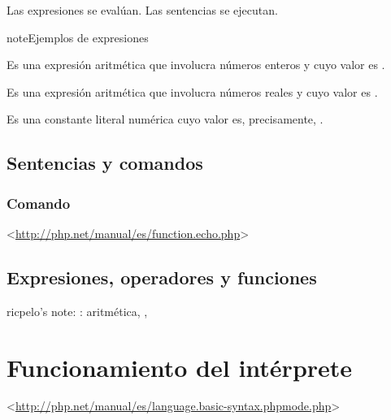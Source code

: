 \documentclass[a4paper,11pt,spanish]{sphinxmanual}
\begin{document}
Las expresiones se evalúan. Las sentencias se ejecutan.

\begin{sphinxadmonition}{note}{Ejemplos de expresiones}

\begin{sphinxVerbatim}[commandchars=\\\{\}]
    
\end{sphinxVerbatim}

Es una expresión aritmética que involucra números enteros y cuyo valor es
.

\begin{sphinxVerbatim}[commandchars=\\\{\}]
  
\end{sphinxVerbatim}

Es una expresión aritmética que involucra números reales y cuyo valor es
.

\begin{sphinxVerbatim}[commandchars=\\\{\}]
\end{sphinxVerbatim}

Es una constante literal numérica cuyo valor es, precisamente, .
\end{sphinxadmonition}


\subsection{Sentencias y comandos}
\label{\detokenize{php:sentencias-y-comandos}}

\subsubsection{Comando }
\label{\detokenize{php:comando-echo}}
\textless{}\url{http://php.net/manual/es/function.echo.php}\textgreater{}


\subsection{Expresiones, operadores y funciones}
\label{\detokenize{php:expresiones-operadores-y-funciones}}
ricpelo's note: : aritmética, , 


\section{Funcionamiento del intérprete}
\label{\detokenize{php:funcionamiento-del-interprete}}
\textless{}\url{http://php.net/manual/es/language.basic-syntax.phpmode.php}\textgreater{}
\end{document}
